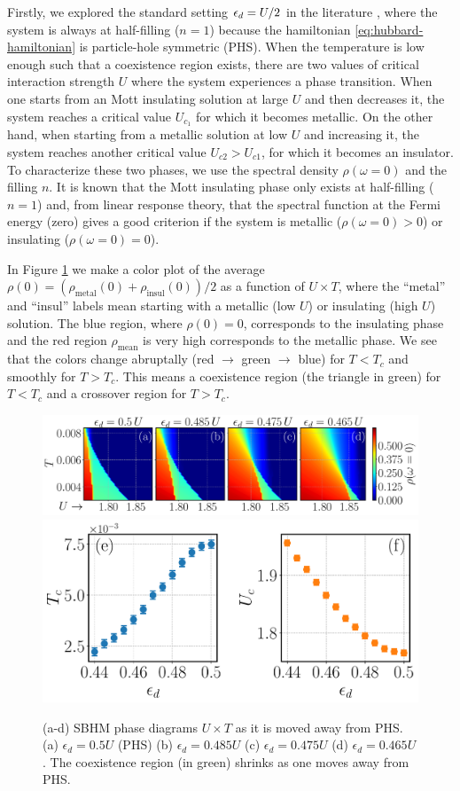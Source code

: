 \documentclass[12pt]{report}
\begin{document}
Firstly, we explored the standard setting $\epsilon_d = U/2$ in the literature \cite{georges1996}, where the system is always at half-filling ($n=1$) because the hamiltonian \ref{eq:hubbard-hamiltonian} is particle-hole symmetric (PHS). When the temperature is low enough such that a coexistence region exists, there are two values of critical interaction strength $U$ where the system experiences a phase transition. When one starts from an Mott insulating solution at large $U$ and then decreases it, the system reaches a critical value $U_{c_1}$ for which it becomes metallic. On the other hand, when starting from a metallic solution at low $U$ and increasing it, the system reaches another critical value $U_{c2} > U_{c1}$, for which it becomes an insulator. To characterize these two phases, we use the spectral density $\rho(\omega = 0)$ and the filling $n$. It is known that the Mott insulating phase only exists at half-filling ($n=1$) \cite{georges1996} and, from linear response theory, that the spectral function at the Fermi energy (zero) gives a good criterion if the system is metallic ($\rho(\omega=0) > 0$) or insulating ($\rho(\omega=0) = 0$).

In Figure \ref{fig:TvsU_ed_Tcvsed} we make a color plot of the average $\rho(0) = (\rho_{\text{metal}}(0) + \rho_{\text{insul}}(0))/2$ as a function of $U \times T$, where the ``metal'' and ``insul'' labels mean starting with a metallic (low $U$) or insulating (high $U$) solution. The blue region, where $\rho(0) = 0$, corresponds to the insulating phase and the red region $\rho_{\text{mean}}$ is very high corresponds to the metallic phase. We see that the colors change abruptally (red $\to$ green $\to$ blue) for $T < T_c$ and smoothly for $T > T_c$. This means a coexistence region (the triangle in green) for $T < T_c$ and a crossover region for $T > T_c$.

\begin{figure}[H]
\centering
\includegraphics[width=\columnwidth]{Figs/fig2-abcd-eps-converted-to.pdf}
\includegraphics[width=0.6\columnwidth]{Figs/fig2-ef-eps-converted-to.pdf}
\caption{(a-d) SBHM phase diagrams  $U \times T$ as it is moved away from PHS. (a) $\epsilon_d=0.5U$ (PHS) (b) $\epsilon_d=0.485U$ (c) $\epsilon_d=0.475U$ (d) $\epsilon_d=0.465U$. The coexistence region (in green) shrinks as one moves away from PHS.  }
\label{fig:TvsU_ed_Tcvsed}
\end{figure}
\end{document}
